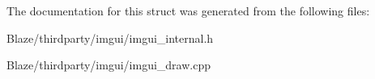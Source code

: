 The documentation for this struct was generated from the following files\+:\begin{DoxyCompactItemize}
\item 
Blaze/thirdparty/imgui/imgui\+\_\+internal.\+h\item 
Blaze/thirdparty/imgui/imgui\+\_\+draw.\+cpp\end{DoxyCompactItemize}

